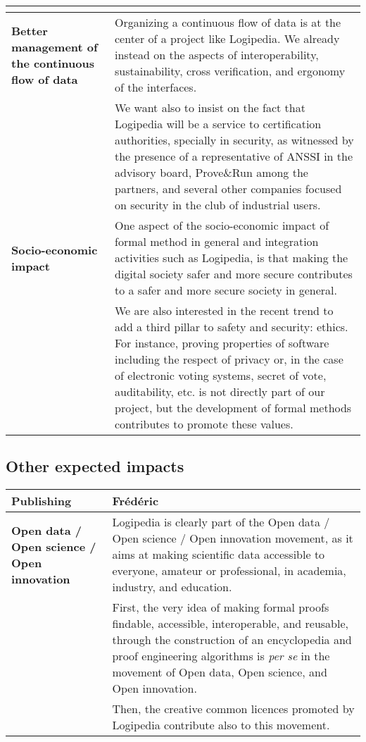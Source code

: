 \begin{longtable}{|p{}|p{}|}
\begin{framed}
\begin{compactitem}
\end{compactitem}


\end{framed}\\
\hline
    {\bf Better management of the continuous flow of data}
    &
Organizing a continuous flow of data is at the center of a project
like Logipedia. We already instead on the aspects of interoperability,
sustainability, cross verification, and ergonomy of the interfaces.\\

&
\hspace{0.4cm}
We want also to insist on the fact that Logipedia will be a service to
certification authorities, specially in security, as witnessed by the
presence of a representative of ANSSI in the advisory board,
Prove\&Run among the partners, and several other companies focused on
security in the club of industrial users.\\
\hline
{\bf Socio-economic impact}
&
One aspect of the socio-economic impact of formal method in general
and integration activities such as Logipedia, is that making the 
digital society safer and more secure contributes to a safer and more 
secure society in general.\\

&
\hspace{0.4cm} We are also interested in the recent trend to add a
third pillar to safety and security: ethics. For instance, proving
properties of software including the respect of privacy or, in the
case of electronic voting systems, secret of vote, auditability, etc.
is not directly part of our project, but the development of formal
methods contributes to promote these values.\\
\hline
\end{longtable}


\subsection*{Other expected impacts}

\begin{longtable}{|p{}|p{}|}
\hline
{\bf Publishing}
&
{\color{red} Frédéric}\\
\hline
{\bf Open data / Open science / Open innovation}
&
Logipedia is clearly part of the Open data / Open science / Open
innovation movement, as it aims at making scientific data accessible
to everyone, amateur or professional, in academia, industry, and
education.\\
&
\hspace{0.4cm}
First, the very idea of making formal proofs findable, accessible,
interoperable, and reusable, through the construction of an
encyclopedia and proof engineering algorithms is {\em per se} in the
movement of Open data, Open science, and Open innovation.\\
&
\hspace{0.4cm}
Then, the creative common licences promoted by Logipedia contribute
also to this movement.\\
\hline
\end{longtable}


